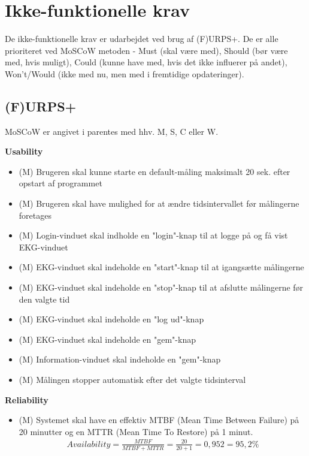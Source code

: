 \section{Ikke-funktionelle krav}
De ikke-funktionelle krav er udarbejdet ved brug af (F)URPS+. De er alle prioriteret ved MoSCoW metoden - Must (skal være med), Should (bør være med, hvis muligt), Could (kunne have med, hvis det ikke influerer på andet), Won't/Would (ikke med nu, men med i fremtidige opdateringer). 

\subsection{(F)URPS+}
MoSCoW er angivet i parentes med hhv. M, S, C eller W.

\textbf{Usability}
\begin{itemize}
	\item (M) Brugeren skal kunne starte en default-måling maksimalt 20 sek. efter opstart af programmet
	\item (M) Brugeren skal have mulighed for at ændre tidsintervallet før målingerne foretages
	\item (M) Login-vinduet skal indholde en "login"-knap til at logge på og få vist EKG-vinduet
	\item (M) EKG-vinduet skal indeholde en "start"-knap til at igangsætte målingerne
	\item (M) EKG-vinduet  skal indeholde en "stop"-knap til at afslutte målingerne før den valgte tid
	\item (M) EKG-vinduet skal indeholde en "log ud"-knap
	\item (M) EKG-vinduet  skal indeholde en "gem"-knap
	\item (M) Information-vinduet skal indeholde en "gem"-knap
	\item (M) Målingen stopper automatisk efter det valgte tidsinterval
\end{itemize}

\textbf{Reliability}
\begin{itemize}
	\item (M) Systemet skal have en effektiv MTBF (Mean Time Between Failure) på 20 minutter og en MTTR (Mean Time To Restore) på 1 minut.
				\begin{align}
					Availability = \frac{MTBF}{MTBF+MTTR} = \frac{20}{20+1} = 0,952 = 95,2 \%
				\end{align}

\end{itemize}

